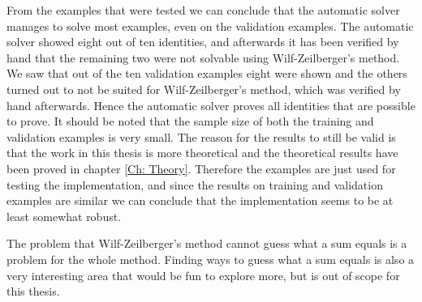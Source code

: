 From the examples that were tested we can conclude that the automatic solver manages to solve most examples, even on the validation examples. The automatic solver showed eight out of ten identities, and afterwards it has been verified by hand that the remaining two were not solvable using Wilf-Zeilberger's method. We saw that out of the ten validation examples eight were shown and the others turned out to not be suited for Wilf-Zeilberger's method, which was verified by hand afterwards. Hence the automatic solver proves all identities that are possible to prove. It should be noted that the sample size of both the training and validation examples is very small. The reason for the results to still be valid is that the work in this thesis is more theoretical and the theoretical results have been proved in chapter \ref{Ch: Theory}. Therefore the examples are just used for testing the implementation, and since the results on training and validation examples are similar we can conclude that the implementation seems to be at least somewhat robust.

The problem that Wilf-Zeilberger's method cannot guess what a sum equals is a problem for the whole method. Finding ways to guess what a sum equals is also a very interesting area that would be fun to explore more, but is out of scope for this thesis.
